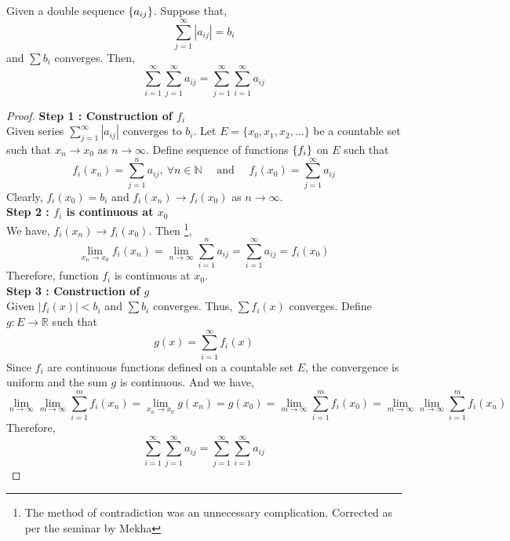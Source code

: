 \begin{theorem}
	Given a double sequence $\left\{a_{ij}\right\}$.
	Suppose that,
	\[ \sum_{j=1}^\infty |a_{ij}| = b_i \]
	and $\sum b_i$ converges.
	Then,
	\[ \sum_{i=1}^\infty \sum_{j=1}^\infty a_{ij} = \sum_{j=1}^\infty \sum_{i=1}^\infty a_{ij} \]
\end{theorem}
\begin{proof}
	\textbf{Step 1 : Construction of $f_i$}\\
	Given series $\displaystyle \sum_{j=1}^\infty |a_{ij}|$ converges to $b_i$.
	Let $E = \{ x_0,x_1,x_2,\dotsc \}$ be a countable set such that $x_n \to x_0$ as $n \to \infty$.
	Define sequence of functions $\left\{f_i\right\}$ on $E$ such that 
	\[ f_i(x_n) = \sum_{j=1}^n a_{ij},\ \forall n \in \mathbb{N} \quad \text{ and } \quad f_i(x_0) = \sum_{j=1}^\infty a_{ij} \]
	Clearly, $f_i(x_0) = b_i$ and $f_i(x_n) \to f_i(x_0)$ as $n \to \infty$.\\

	\textbf{Step 2 : $f_i$ is continuous at $x_0$}\\
	We have, $f_i(x_n) \to f_i(x_0)$.
	{\color{red}Then \dag\footnote{
		The method of contradiction was an unnecessary complication.
		Corrected as per the seminar by Mekha},
	\[ \lim_{x_n \to x_0} f_i(x_n) = \lim_{n \to \infty} \sum_{i=1}^n a_{ij} = \sum_{i=1}^\infty a_{ij} = f_i(x_0) \]
	}
	Therefore, function $f_i$ is continuous at $x_0$.\\

	\textbf{Step 3 : Construction of $g$}\\
	Given $|f_i(x)| < b_i$ and $\sum b_i$ converges.
	Thus, $\sum f_i(x)$ converges.
	Define $g : E \to \mathbb{R}$ such that
	\[ g(x) = \sum_{i = 1}^\infty f_i(x) \]
	Since $f_i$ are continuous functions defined on a countable set $E$, the convergence is uniform and the sum $g$ is continuous.
	And we have,
	\[ \lim_{n \to \infty} \lim_{m \to \infty} \sum_{i=1}^m f_i(x_n) = \lim_{x_n \to x_0} g(x_n) = g(x_0) = \lim_{m \to \infty} \sum_{i=1}^m f_i(x_0) = \lim_{m \to \infty} \lim_{n \to \infty} \sum_{i = 1}^m f_i(x_n) \]
	{\color{red}
	Therefore,
	\[ \sum_{i=1}^\infty \sum_{j=1}^\infty a_{ij} = \sum_{j=1}^\infty \sum_{i=1}^\infty a_{ij} \]
	}
\end{proof}

